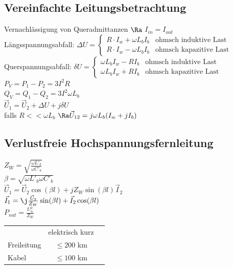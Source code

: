 \documentclass[european]{latex4ei_sheet}
\begin{document}
		\subsection{Vereinfachte Leitungsbetrachtung}
		
		
		Vernachlässigung von Queradmittanzen $\Ra$ $I_{in} = I_{out}$\\
		Längsspannungsabfall: $\Delta U = \begin{cases} R \cdot I_w + \omega L_b I_b & \text{ohmsch induktive Last} \\ R \cdot I_w - \omega L_b I_b  & \text{ohmsch kapazitive Last} \end{cases} $\\
		Querspannungsabfall: $\delta U = \begin{cases} \omega L_b I_w - R I_b & \text{ohmsch induktive Last} \\ \omega L_b I_w + R I_b & \text{ohmsch kapazitive Last} \end{cases}$\\
		$P_V = P_1 - P_2 = 3 I^2 R$ \\
		$Q_V = Q_1 - Q_2 = 3 I^2 \omega L_b$ \\
		$\vec U_1 = \vec U_2 + \Delta U + j \delta U$ \\
		falls $R << \omega L_b$ \quad $\Ra \vec U_{12} = j \omega L_b (I_w + j I_b)$
		
		\subsection{Verlustfreie Hochspannungsfernleitung}
		
		
		$Z_W = \sqrt{\frac{\omega L'_b}{\omega C'_b}}$ \\
		$\beta = \sqrt{\omega L'_b \omega C'_b}$ \\
		$\vec U_1 = \vec U_2 \cos (\beta l) + j Z_W \sin (\beta l) \vec I_2$ \\
		$\vec I_1 = \j \frac{\vec U_2}{Z_W} \sin (\beta l) + \vec I_2 \cos (\beta l)$ \\
		$P_{nat} = \frac{U_n^2}{Z_W}$ \\
		
		\begin{tabular}{lcc}
		 & elektrisch kurz \\
		Freileitung & $\le 200$ km \\
		Kabel & $\le 100$ km
		\end{tabular}
\end{document}
